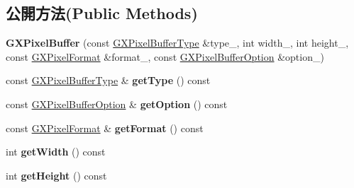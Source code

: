 \subsection*{公開方法(Public Methods)}
\begin{DoxyCompactItemize}
\item 
{\bfseries G\+X\+Pixel\+Buffer} (const \hyperlink{class_i_dream_sky_1_1_g_x_pixel_buffer_type}{G\+X\+Pixel\+Buffer\+Type} \&type\+\_\+, int width\+\_\+, int height\+\_\+, const \hyperlink{class_i_dream_sky_1_1_g_x_pixel_format}{G\+X\+Pixel\+Format} \&format\+\_\+, const \hyperlink{class_i_dream_sky_1_1_g_x_pixel_buffer_option}{G\+X\+Pixel\+Buffer\+Option} \&option\+\_\+)\hypertarget{class_i_dream_sky_1_1_g_x_pixel_buffer_aaf2ebfeaef2659e1a3f81cc44cef3199}{}\label{class_i_dream_sky_1_1_g_x_pixel_buffer_aaf2ebfeaef2659e1a3f81cc44cef3199}

\item 
const \hyperlink{class_i_dream_sky_1_1_g_x_pixel_buffer_type}{G\+X\+Pixel\+Buffer\+Type} \& {\bfseries get\+Type} () const \hypertarget{class_i_dream_sky_1_1_g_x_pixel_buffer_a8d95a028756c418ff3a99ef67ab04839}{}\label{class_i_dream_sky_1_1_g_x_pixel_buffer_a8d95a028756c418ff3a99ef67ab04839}

\item 
const \hyperlink{class_i_dream_sky_1_1_g_x_pixel_buffer_option}{G\+X\+Pixel\+Buffer\+Option} \& {\bfseries get\+Option} () const \hypertarget{class_i_dream_sky_1_1_g_x_pixel_buffer_a0cde52dfc5bee23517ca5957ebd6a6d2}{}\label{class_i_dream_sky_1_1_g_x_pixel_buffer_a0cde52dfc5bee23517ca5957ebd6a6d2}

\item 
const \hyperlink{class_i_dream_sky_1_1_g_x_pixel_format}{G\+X\+Pixel\+Format} \& {\bfseries get\+Format} () const \hypertarget{class_i_dream_sky_1_1_g_x_pixel_buffer_a8703eaa304411a6ab9a40ffd15eb0e45}{}\label{class_i_dream_sky_1_1_g_x_pixel_buffer_a8703eaa304411a6ab9a40ffd15eb0e45}

\item 
int {\bfseries get\+Width} () const \hypertarget{class_i_dream_sky_1_1_g_x_pixel_buffer_a88b4915874de8547342cb9ffef2a4bdc}{}\label{class_i_dream_sky_1_1_g_x_pixel_buffer_a88b4915874de8547342cb9ffef2a4bdc}

\item 
int {\bfseries get\+Height} () const \hypertarget{class_i_dream_sky_1_1_g_x_pixel_buffer_a04717159dcea08fd0e25b2ce30d3ae68}{}\label{class_i_dream_sky_1_1_g_x_pixel_buffer_a04717159dcea08fd0e25b2ce30d3ae68}


\end{DoxyCompactItemize}

